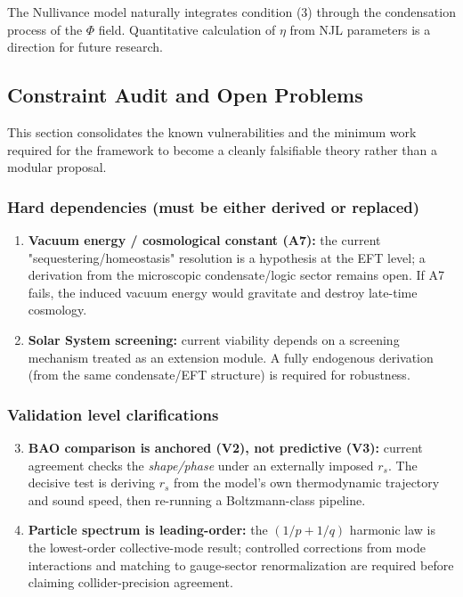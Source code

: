 \documentclass[a4paper,12pt]{article}
\begin{document}
The Nullivance model naturally integrates condition (3) through the condensation process of the $\Phi$ field. Quantitative calculation of $\eta$ from NJL parameters is a direction for future research.

\subsection{Constraint Audit and Open Problems}
This section consolidates the known vulnerabilities and the minimum work required for the framework to become a cleanly falsifiable theory rather than a modular proposal.

\subsubsection{Hard dependencies (must be either derived or replaced)}
\begin{enumerate}
    \item \textbf{Vacuum energy / cosmological constant (A7):} the current "sequestering/homeostasis" resolution is a hypothesis at the EFT level; a derivation from the microscopic condensate/logic sector remains open. If A7 fails, the induced vacuum energy would gravitate and destroy late-time cosmology.
    \item \textbf{Solar System screening:} current viability depends on a screening mechanism treated as an extension module. A fully endogenous derivation (from the same condensate/EFT structure) is required for robustness.
\end{enumerate}

\subsubsection{Validation level clarifications}
\begin{enumerate}
    \setcounter{enumi}{2}
    \item \textbf{BAO comparison is anchored (V2), not predictive (V3):} current agreement checks the \emph{shape/phase} under an externally imposed $r_s$. The decisive test is deriving $r_s$ from the model's own thermodynamic trajectory and sound speed, then re-running a Boltzmann-class pipeline.
    \item \textbf{Particle spectrum is leading-order:} the $(1/p + 1/q)$ harmonic law is the lowest-order collective-mode result; controlled corrections from mode interactions and matching to gauge-sector renormalization are required before claiming collider-precision agreement.
\end{enumerate}
\end{document}
